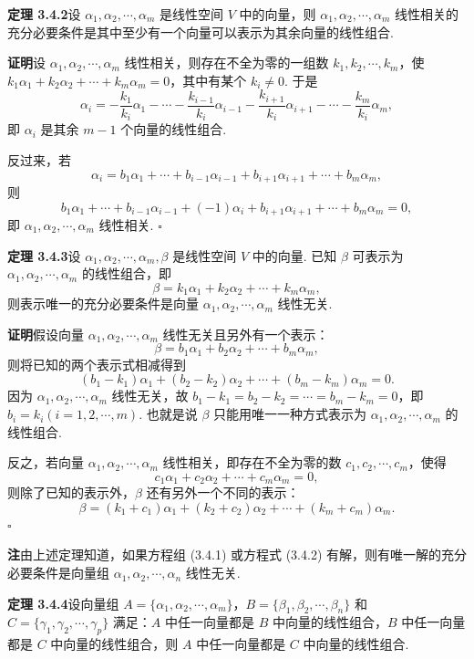 \documentclass[UTF8,12pt,a4paper,fontset=fandol]{ctexart}
\begin{document}
\noindent\textbf{定理 3.4.2}\quad 设 $\alpha_1,\alpha_2,\cdots,\alpha_m$ 是线性空间 $V$ 中的向量，则 $\alpha_1,\alpha_2,\cdots,\alpha_m$ 线性相关的充分必要条件是其中至少有一个向量可以表示为其余向量的线性组合.

\noindent\textbf{证明}\quad 设 $\alpha_1,\alpha_2,\cdots,\alpha_m$ 线性相关，则存在不全为零的一组数 $k_1,k_2,\cdots,k_m$，使 $k_1\alpha_1+k_2\alpha_2+\cdots+k_m\alpha_m=0$，其中有某个 $k_i\neq 0$. 于是
\[
\alpha_i=-\frac{k_1}{k_i}\alpha_1-\cdots-\frac{k_{i-1}}{k_i}\alpha_{i-1}-\frac{k_{i+1}}{k_i}\alpha_{i+1}-\cdots-\frac{k_m}{k_i}\alpha_m,
\]
即 $\alpha_i$ 是其余 $m-1$ 个向量的线性组合.

反过来，若
\[
\alpha_i=b_1\alpha_1+\cdots+b_{i-1}\alpha_{i-1}+b_{i+1}\alpha_{i+1}+\cdots+b_m\alpha_m,
\]
则
\[
b_1\alpha_1+\cdots+b_{i-1}\alpha_{i-1}+(-1)\alpha_i+b_{i+1}\alpha_{i+1}+\cdots+b_m\alpha_m=0,
\]
即 $\alpha_1,\alpha_2,\cdots,\alpha_m$ 线性相关. $\square$

\noindent\textbf{定理 3.4.3}\quad 设 $\alpha_1,\alpha_2,\cdots,\alpha_m,\beta$ 是线性空间 $V$ 中的向量. 已知 $\beta$ 可表示为 $\alpha_1,\alpha_2,\cdots,\alpha_m$ 的线性组合，即
\[
\beta=k_1\alpha_1+k_2\alpha_2+\cdots+k_m\alpha_m,
\]
则表示唯一的充分必要条件是向量 $\alpha_1,\alpha_2,\cdots,\alpha_m$ 线性无关.

\noindent\textbf{证明}\quad 假设向量 $\alpha_1,\alpha_2,\cdots,\alpha_m$ 线性无关且另外有一个表示：
\[
\beta=b_1\alpha_1+b_2\alpha_2+\cdots+b_m\alpha_m,
\]
则将已知的两个表示式相减得到
\[
(b_1-k_1)\alpha_1+(b_2-k_2)\alpha_2+\cdots+(b_m-k_m)\alpha_m=0.
\]
因为 $\alpha_1,\alpha_2,\cdots,\alpha_m$ 线性无关，故 $b_1-k_1=b_2-k_2=\cdots=b_m-k_m=0$，即 $b_i=k_i(i=1,2,\cdots,m)$. 也就是说 $\beta$ 只能用唯一一种方式表示为 $\alpha_1,\alpha_2,\cdots,\alpha_m$ 的线性组合.

反之，若向量 $\alpha_1,\alpha_2,\cdots,\alpha_m$ 线性相关，即存在不全为零的数 $c_1,c_2,\cdots,c_m$，使得
\[
c_1\alpha_1+c_2\alpha_2+\cdots+c_m\alpha_m=0,
\]
则除了已知的表示外，$\beta$ 还有另外一个不同的表示：
\[
\beta=(k_1+c_1)\alpha_1+(k_2+c_2)\alpha_2+\cdots+(k_m+c_m)\alpha_m.
\]
$\square$

\noindent\textbf{注}\quad 由上述定理知道，如果方程组 (3.4.1) 或方程式 (3.4.2) 有解，则有唯一解的充分必要条件是向量组 $\alpha_1,\alpha_2,\cdots,\alpha_n$ 线性无关.

\noindent\textbf{定理 3.4.4}\quad 设向量组 $A=\{\alpha_1,\alpha_2,\cdots,\alpha_m\}$，$B=\{\beta_1,\beta_2,\cdots,\beta_n\}$ 和 $C=\{\gamma_1,\gamma_2,\cdots,\gamma_p\}$ 满足：$A$ 中任一向量都是 $B$ 中向量的线性组合，$B$ 中任一向量都是 $C$ 中向量的线性组合，则 $A$ 中任一向量都是 $C$ 中向量的线性组合.
\end{document}
